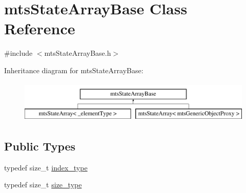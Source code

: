 \hypertarget{classmts_state_array_base}{\section{mts\-State\-Array\-Base Class Reference}
\label{classmts_state_array_base}
}


{\ttfamily \#include $<$mts\-State\-Array\-Base.\-h$>$}

Inheritance diagram for mts\-State\-Array\-Base\-:\begin{figure}[H]
\begin{center}
\leavevmode
\includegraphics[height=2.000000cm]{db/d25/classmts_state_array_base}
\end{center}
\end{figure}
\subsection*{Public Types}
\begin{DoxyCompactItemize}
\item 
typedef size\-\_\-t \hyperlink{classmts_state_array_base_a22ecbf65a907a7550951d12970f3df1d}{index\-\_\-type}
\item 
typedef size\-\_\-t \hyperlink{classmts_state_array_base_a2a29f8b24a48620f67c907fc5592fc17}{size\-\_\-type}
\end{DoxyCompactItemize}

